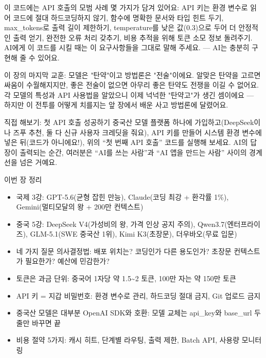 이 코드에는 API 호출의 모범 사례 몇 가지가 담겨 있어요: API 키는 환경 변수로 읽어 코드에 절대 하드코딩하지 않기, 함수에 명확한 문서와 타입 힌트 두기, max\_tokens로 출력 길이 제한하기, temperature를 낮은 값(0.3)으로 두어 더 안정적인 출력 얻기, 완전한 오류 처리 갖추기, 비용 추적을 위해 토큰 소모 정보 돌려주기. AI에게 이 코드를 시킬 때는 이 요구사항들을 그대로 말해 주세요. — AI는 충분히 구현해 줄 수 있어요.

이 장의 마지막 교훈: 모델은 "탄약"이고 방법론은 "전술"이에요. 알맞은 탄약을 고르면 싸움이 수월해지지만, 좋은 전술이 없으면 아무리 좋은 탄약도 전쟁을 이길 수 없어요. 각 모델의 특성과 API 사용법을 알았으니 이제 넉넉한 "탄약고"가 생긴 셈이에요 — 하지만 이 전투를 어떻게 치를지는 앞 장에서 배운 사고 방법론에 달렸어요.

\begin{tcbpractice}{직접 해보기: 첫 API 호출 성공하기}
중국산 모델 플랫폼 하나에 가입하고(DeepSeek이나 즈푸 추천, 둘 다 신규 사용자 크레딧을 줘요), API 키를 만들어 시스템 환경 변수에 넣은 뒤(코드가 아니에요!), 위의 “첫 번째 API 호출” 코드를 실행해 보세요. AI의 답장이 출력되는 순간, 여러분은 “AI를 쓰는 사람”과 “AI 앱을 만드는 사람” 사이의 경계선을 넘은 거예요.

\end{tcbpractice}

\begin{tcbsummary}{이번 장 정리}
\begin{itemize}
  \item 국제 3강: GPT-5.6(균형 잡힌 만능), Claude(코딩 최강 + 환각률 1\%), Gemini(멀티모달의 왕 + 200만 컨텍스트)
  \item 중국 5강: DeepSeek V4(가성비의 왕, 가격 인상 공지 주의), Qwen3.7(엔터프라이즈), GLM-5.1(SWE 중국산 1위), Kimi K3(초장문), 더우바오(무료 입문)
  \item 네 가지 질문 의사결정법: 배포 위치는? 코딩인가 다른 용도인가? 초장문 컨텍스트가 필요한가? 예산에 민감한가?
  \item 토큰은 과금 단위: 중국어 1자당 약 1.5\textasciitilde{}2 토큰, 100만 자는 약 150만 토큰
  \item API 키 = 지갑 비밀번호: 환경 변수로 관리, 하드코딩 절대 금지, Git 업로드 금지
  \item 중국산 모델은 대부분 OpenAI SDK와 호환: 모델 교체는 api\_key와 base\_url 두 줄만 바꾸면 끝
  \item 비용 절약 5가지: 캐시 히트, 단계별 라우팅, 출력 제한, Batch API, 사용량 모니터링
\end{itemize}

\end{tcbsummary}
